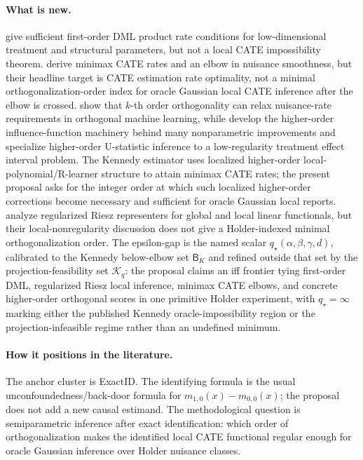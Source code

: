 \documentclass[11pt]{article}
\theoremstyle{definition}
\theoremstyle{plain}
\theoremstyle{remark}
\begin{document}
\paragraph{What is new.}
\citet[\S3]{ChernozhukovEtAl2018DML} give sufficient first-order DML product
rate conditions for low-dimensional treatment and structural parameters, but
not a local CATE impossibility theorem.  \citet[\S2--\S4]{KennedyBalakrishnanRobinsWasserman2024MinimaxCATE}
derive minimax CATE rates and an elbow in nuisance smoothness, but their
headline target is CATE estimation rate optimality, not a minimal
orthogonalization-order index for oracle Gaussian local CATE inference after
the elbow is crossed.  \citet[\S2.1, \S3.1, Corollary 4]{MackeySyrgkanisZadik2018OML} show that \(k\)-th
order orthogonality can relax nuisance-rate requirements in orthogonal machine
learning, while \citet{RobinsLiTchetgenVanDerVaart2008HOIF} develop the
higher-order influence-function machinery behind many nonparametric
improvements and \citet{LiTchetgenVanDerVaartRobins2011HOIFTreatment}
specialize higher-order U-statistic inference to a low-regularity treatment
effect interval problem.  The Kennedy estimator uses localized higher-order
local-polynomial/R-learner structure to attain minimax CATE rates; the present
proposal asks for the integer order at which such localized higher-order
corrections become necessary and sufficient for oracle Gaussian local reports.
\citet[\S2--\S3]{ChernozhukovNeweySingh2022Riesz} analyze
regularized Riesz representers for global and local linear functionals, but
their local-nonregularity discussion does not give a Holder-indexed minimal
orthogonalization order.  The epsilon-gap is the named scalar
\(q_\star(\alpha,\beta,\gamma,d)\), calibrated to the Kennedy below-elbow set
\(\mathsf B_K\) and refined outside that set by the projection-feasibility set
\(\mathcal K_q\): the proposal claims an iff frontier tying first-order DML,
regularized Riesz local inference, minimax CATE elbows, and concrete
higher-order orthogonal scores in one primitive Holder experiment, with
\(q_\star=\infty\) marking either the published Kennedy oracle-impossibility
region or the projection-infeasible regime rather than an undefined minimum.

\paragraph{How it positions in the literature.}
The anchor cluster is ExactID.  The identifying formula is the usual
unconfoundedness/back-door formula for \(m_{1,0}(x)-m_{0,0}(x)\); the proposal
does not add a new causal estimand.  The methodological question is
semiparametric inference after exact identification: which order of
orthogonalization makes the identified local CATE functional regular enough
for oracle Gaussian inference over Holder nuisance classes.
\end{document}
